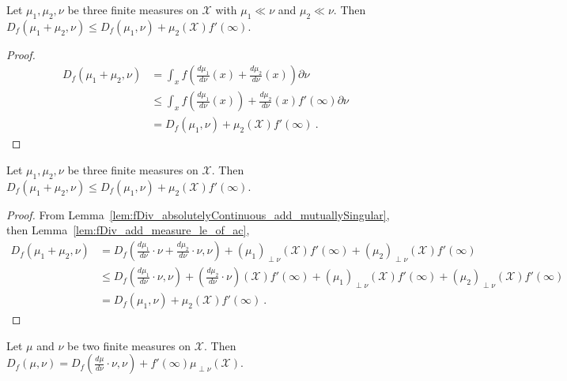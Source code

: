 \begin{lemma}
  \label{lem:fDiv_add_measure_le_of_ac}
  \leanok
  Let $\mu_1, \mu_2, \nu$ be three finite measures on $\mathcal X$ with $\mu_1 \ll \nu$ and $\mu_2 \ll \nu$. Then
  $D_f(\mu_1 + \mu_2, \nu) \le D_f(\mu_1, \nu) + \mu_2(\mathcal X) f'(\infty)$.
\end{lemma}

\begin{proof}\leanok
\begin{align*}
D_f(\mu_1 + \mu_2, \nu)
&= \int_x f \left( \frac{d \mu_1}{d\nu}(x) + \frac{d\mu_2}{d\nu}(x) \right) \partial \nu
\\
&\le \int_x f \left( \frac{d \mu_1}{d\nu}(x) \right) + \frac{d\mu_2}{d\nu}(x) f'(\infty) \partial \nu
\\
&= D_f(\mu_1, \nu) + \mu_2(\mathcal X) f'(\infty)
\: .
\end{align*}
\end{proof}


\begin{lemma}
  \label{lem:fDiv_add_measure_le}
  \leanok
  Let $\mu_1, \mu_2, \nu$ be three finite measures on $\mathcal X$. Then
  $D_f(\mu_1 + \mu_2, \nu) \le D_f(\mu_1, \nu) + \mu_2(\mathcal X) f'(\infty)$.
\end{lemma}

\begin{proof}\leanok
{}
From Lemma~\ref{lem:fDiv_absolutelyContinuous_add_mutuallySingular}, then Lemma~\ref{lem:fDiv_add_measure_le_of_ac},
\begin{align*}
D_f(\mu_1 + \mu_2, \nu)
&= D_f(\frac{d\mu_1}{d \nu}\cdot \nu + \frac{d\mu_2}{d \nu}\cdot \nu, \nu) + (\mu_1)_{\perp\nu}(\mathcal X) f'(\infty) + (\mu_2)_{\perp\nu}(\mathcal X) f'(\infty)
\\
&\le D_f(\frac{d\mu_1}{d \nu}\cdot \nu, \nu) + (\frac{d\mu_2}{d \nu}\cdot \nu)(\mathcal X) f'(\infty) + (\mu_1)_{\perp\nu}(\mathcal X) f'(\infty) + (\mu_2)_{\perp\nu}(\mathcal X) f'(\infty)
\\
&= D_f(\mu_1, \nu) + \mu_2(\mathcal X) f'(\infty)
\: .
\end{align*}
\end{proof}


\begin{lemma}
  \label{lem:fDiv_eq_add_withDensity_derivAtTop}
  \leanok
  Let $\mu$ and $\nu$ be two finite measures on $\mathcal X$.
  Then $D_f(\mu, \nu) = D_f(\frac{d\mu}{d\nu}\cdot \nu, \nu) + f'(\infty) \mu_{\perp \nu}(\mathcal X)$.
\end{lemma}

